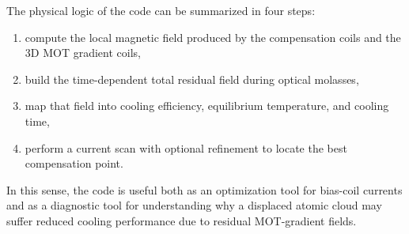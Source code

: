 \documentclass[12pt,a4paper]{article}
\begin{document}
The physical logic of the code can be summarized in four steps:
\begin{enumerate}
  \item compute the local magnetic field produced by the compensation coils and the 3D MOT gradient coils,
  \item build the time-dependent total residual field during optical molasses,
  \item map that field into cooling efficiency, equilibrium temperature, and cooling time,
  \item perform a current scan with optional refinement to locate the best compensation point.
\end{enumerate}

In this sense, the code is useful both as an optimization tool for bias-coil currents and as a diagnostic tool for understanding why a displaced atomic cloud may suffer reduced cooling performance due to residual MOT-gradient fields.
\end{document}
